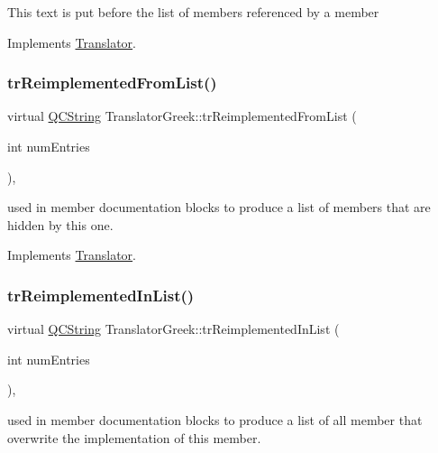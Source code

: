 This text is put before the list of members referenced by a member 

Implements \mbox{\hyperlink{class_translator}{Translator}}.

\mbox{\label{class_translator_greek_a1b4f84ad052156793fc5e4005a40685e}} 
\subsubsection{\texorpdfstring{trReimplementedFromList()}{trReimplementedFromList()}}
{\footnotesize\ttfamily virtual \mbox{\hyperlink{class_q_c_string}{Q\+C\+String}} Translator\+Greek\+::tr\+Reimplemented\+From\+List (\begin{DoxyParamCaption}\item[{int}]{num\+Entries }\end{DoxyParamCaption})\hspace{0.3cm}{\ttfamily [inline]}, {\ttfamily [virtual]}}

used in member documentation blocks to produce a list of members that are hidden by this one. 

Implements \mbox{\hyperlink{class_translator}{Translator}}.

\mbox{\label{class_translator_greek_ad886eac93bffb6854142e9af86919563}} 
\subsubsection{\texorpdfstring{trReimplementedInList()}{trReimplementedInList()}}
{\footnotesize\ttfamily virtual \mbox{\hyperlink{class_q_c_string}{Q\+C\+String}} Translator\+Greek\+::tr\+Reimplemented\+In\+List (\begin{DoxyParamCaption}\item[{int}]{num\+Entries }\end{DoxyParamCaption})\hspace{0.3cm}{\ttfamily [inline]}, {\ttfamily [virtual]}}

used in member documentation blocks to produce a list of all member that overwrite the implementation of this member. 

